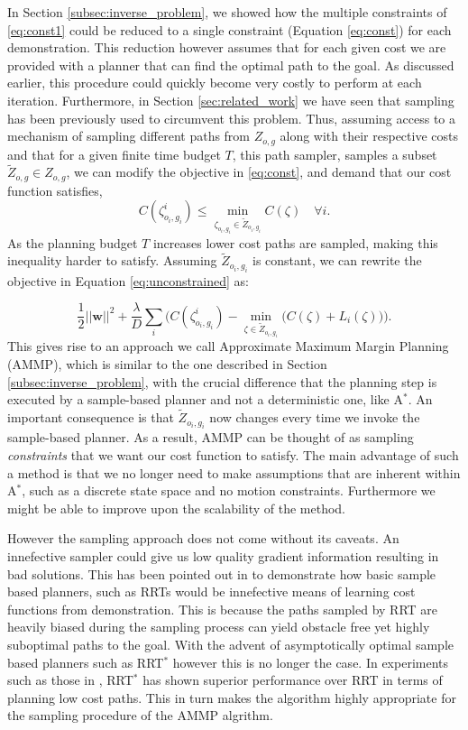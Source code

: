 \documentclass{article}  %
\begin{document}
		In Section \ref{subsec:inverse_problem}, we showed how the multiple constraints of \eqref{eq:const1} could be reduced to a single constraint (Equation \eqref{eq:const}) for each demonstration. This reduction however assumes that for each given cost we are provided with a planner that can find the optimal path to the goal. As discussed earlier, this procedure could quickly become very costly to perform at each iteration. Furthermore, in Section \ref{sec:related_work} we have seen that sampling has been previously used to circumvent this problem.
		 Thus, assuming access to a mechanism of sampling different paths from $Z_{o,g}$ along with their respective costs and that for a given finite time budget $T$, this path sampler, samples a subset $\tilde{Z}_{o,g} \in Z_{o,g}$, we can modify the objective in \eqref{eq:const}, and demand that our cost function satisfies,
\begin{equation}
	C(\zeta^i_{o_i,g_i}) \leq \min_{\zeta_{o_i,g_i} \in \tilde{Z}_{o_i,g_i}} C(\zeta) \quad \forall i. \label{eq:const_rrt}
\end{equation}
	As the planning budget $T$ increases lower cost paths are sampled, making this inequality harder to satisfy. Assuming $\tilde{Z}_{o_i,g_i}$ is constant, we can rewrite the objective in Equation \eqref{eq:unconstrained} as:

	\begin{equation} \frac{1}{2}||\mathbf{w}||^2 + \frac{\lambda}{D} \sum_i \big( C(\zeta^i_{o_i,g_i}) - \min_{\zeta \in \tilde{Z}_{o_i,g_i}}\big(C(\zeta) + L_i(\zeta)\big) \big). \label{eq:unconstrained_rrt}
	\end{equation}
	This gives rise to an approach we call Approximate Maximum Margin Planning (AMMP), which is similar  to the one described in Section \ref{subsec:inverse_problem}, with the crucial difference that the planning step is executed by a sample-based planner and not a deterministic one, like A$^*$. An important consequence is that $\tilde{Z}_{o_i,g_i}$ now changes every time we invoke the sample-based planner. As a result, AMMP can be thought of as sampling \emph{constraints} that we want our cost function to satisfy. The main advantage of such a method is that we no longer need to make assumptions that are inherent within A$^*$, such as a discrete state space and no motion constraints. Furthermore we might be able to improve upon the scalability of the method. 

	However the sampling approach does not come without its caveats. An innefective sampler could give us low quality gradient information resulting in bad solutions. This has been pointed out in \cite{ratliff2009chomp} to demonstrate how basic sample based planners, such as RRTs would be innefective means of learning cost functions from demonstration. This is because the paths sampled by RRT are heavily biased during the sampling process can yield obstacle free yet highly suboptimal paths to the goal. With the advent of asymptotically optimal sample based planners such as RRT$^*$ however this is no longer the case. In experiments such as those in \cite{karaman2011sampling}, RRT$^*$ has shown superior performance over RRT in terms of planning low cost paths. This in turn makes the algorithm highly appropriate for the sampling procedure of the AMMP algrithm.  
\end{document}
